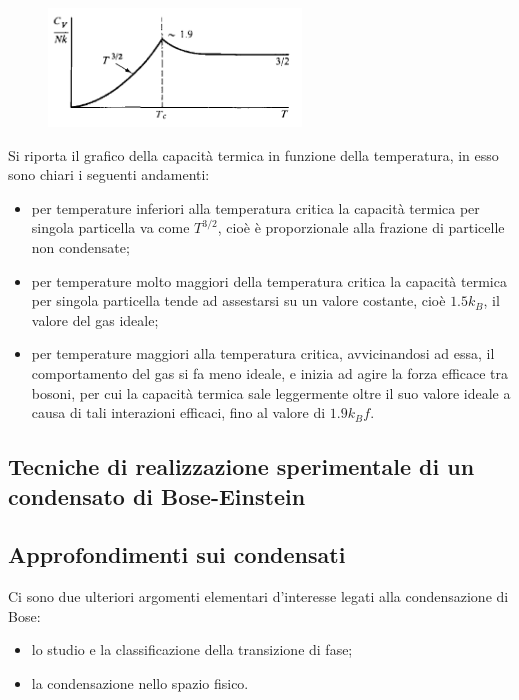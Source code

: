 \begin{figure}[t]
	\centering
	\includegraphics[width=0.6\textwidth]{Immagini/BoseThermalCapacity.png}
	\vspace{-10pt}
	\caption{}
	\label{fig:thermcapbose}
	\vspace{-10pt}
\end{figure}

Si riporta il grafico della capacità termica in funzione della temperatura, in esso sono chiari i seguenti andamenti:
\begin{itemize}
	\item per temperature inferiori alla temperatura critica la capacità termica per singola particella va come $ T^{3/2} $, cioè è proporzionale alla frazione di particelle non condensate;
	\item per temperature molto maggiori della temperatura critica la capacità termica per singola particella tende ad assestarsi su un valore costante, cioè $ 1.5 k_B $, il valore del gas ideale;
	\item per temperature maggiori alla temperatura critica, avvicinandosi ad essa, il comportamento del gas si fa meno ideale, e inizia ad agire la forza efficace tra bosoni, per cui la capacità termica sale leggermente oltre il suo valore ideale a causa di tali interazioni efficaci, fino al valore di $ 1.9 k_Bf $.
\end{itemize}

\subsection{Tecniche di realizzazione sperimentale di un condensato di Bose-Einstein}


\subsection{Approfondimenti sui condensati}
Ci sono due ulteriori argomenti elementari d'interesse legati alla condensazione di Bose:
\begin{itemize}
	\item lo studio e la classificazione della transizione di fase;
	\item la condensazione nello spazio fisico.
\end{itemize}

